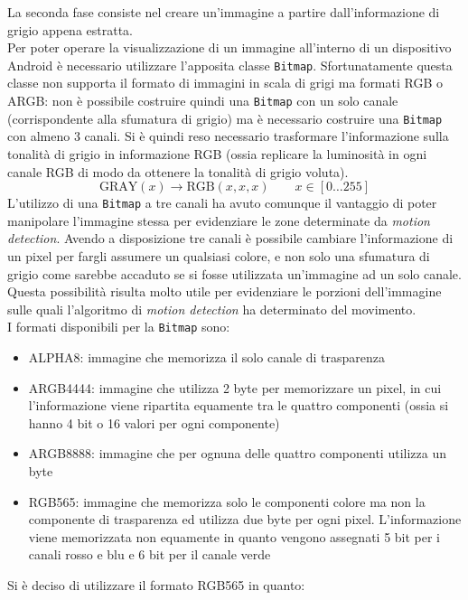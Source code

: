 La seconda fase consiste nel creare un'immagine a partire dall'informazione di grigio appena estratta.\\
Per poter operare la visualizzazione di un immagine all'interno di un dispositivo Android è necessario utilizzare l'apposita classe \texttt{Bitmap}. Sfortunatamente questa classe non supporta il formato di immagini in scala di grigi ma formati RGB o ARGB: non è possibile costruire quindi una \texttt{Bitmap} con un solo canale (corrispondente alla sfumatura di grigio) ma è necessario costruire una \texttt{Bitmap} con almeno 3 canali. Si è quindi reso necessario trasformare l'informazione sulla tonalità di grigio in informazione RGB (ossia replicare la luminosità in ogni canale RGB di modo da ottenere la tonalità di grigio voluta).
\[\text{GRAY}(x) \to \text{RGB}(x, x, x) \qquad x \in [0 \ldots 255] \]
L'utilizzo di una \texttt{Bitmap} a tre canali ha avuto comunque il vantaggio di poter manipolare l'immagine stessa per evidenziare le zone determinate da \textit{motion detection}. Avendo a disposizione tre canali è possibile cambiare l'informazione di un pixel per fargli assumere un qualsiasi colore, e non solo una sfumatura di grigio come sarebbe accaduto se si fosse utilizzata un'immagine ad un solo canale. Questa possibilità risulta molto utile per evidenziare le porzioni dell'immagine sulle quali l'algoritmo di \textit{motion detection} ha determinato del movimento.\\
I formati disponibili per la \texttt{Bitmap} sono:
\begin{itemize}
  \item ALPHA8: immagine che memorizza il solo canale di trasparenza
  \item ARGB4444: immagine che utilizza 2 byte per memorizzare un pixel, in cui l'informazione viene ripartita equamente tra le quattro componenti (ossia si hanno 4 bit o 16 valori per ogni componente)
  \item ARGB8888: immagine che per ognuna delle quattro componenti utilizza un byte
  \item RGB565: immagine che memorizza solo le componenti colore ma non la componente di trasparenza ed utilizza due byte per ogni pixel. L'informazione viene memorizzata non equamente in quanto vengono assegnati 5 bit per i canali rosso e blu e 6 bit per il canale verde
\end{itemize}
Si è deciso di utilizzare il formato RGB565 in quanto:
